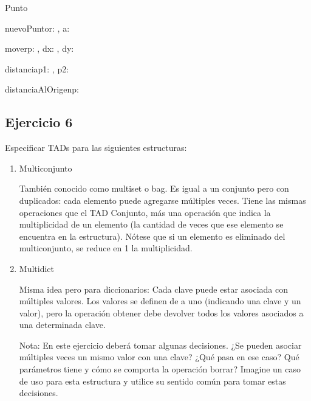 \begin{tad}{Punto}{} \hacer

	\begin{proc}{nuevoPunto}{\In r: \float, \In a: \float}{\tadtype}
	\end{proc}

	\begin{proc}{mover}{\Inout p: \tadtype, \In dx: \float, \In dy: \float}{}
	\end{proc}

	\begin{proc}{distancia}{\In p1: \tadtype, \In p2: \tadtype}{\float}
	\end{proc}

	\begin{proc}{distanciaAlOrigen}{\In p: \tadtype}{\float}
	\end{proc}
\end{tad}

\subsection{Ejercicio 6}
Especificar TADs para las siguientes estructuras:

\begin{enumerate}[label=\alph*)]
	\item Multiconjunto

	      También conocido como multiset o bag. Es igual a un conjunto pero con duplicados: cada elemento puede agregarse múltiples veces. Tiene las mismas operaciones que el TAD Conjunto, más una operación que indica la multiplicidad de un elemento (la cantidad de veces que ese elemento se encuentra en la estructura). Nótese que si un elemento es eliminado del multiconjunto, se reduce en 1 la multiplicidad.

	\item Multidict

	      Misma idea pero para diccionarios: Cada clave puede estar asociada con múltiples valores. Los valores se definen de a uno (indicando una clave y un valor), pero la operación obtener debe devolver todos los valores asociados a una determinada clave.

	      Nota: En este ejercicio deberá tomar algunas decisiones. ¿Se pueden asociar múltiples veces un mismo valor con una clave? ¿Qué pasa en ese caso? Qué parámetros tiene y cómo se comporta la operación borrar? Imagine un caso de uso para esta estructura y utilice su sentido común para tomar estas decisiones.
\end{enumerate}

